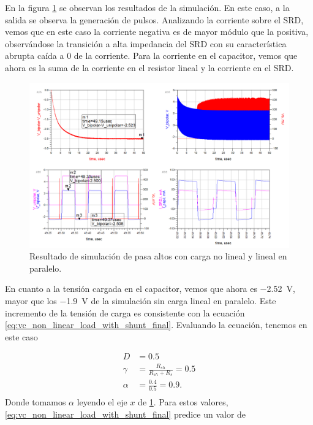 En la figura \ref{fig:highpass_non_linear_w_shunt_simulation_result} se observan
los resultados de la simulación. En este caso, a la salida se observa la
generación de pulsos. Analizando la corriente sobre el SRD, vemos que en este
caso la corriente negativa es de mayor módulo que la positiva, observándose la
transición a alta impedancia del SRD con su característica abrupta caída a $0$
de la corriente. Para la corriente en el capacitor, vemos que ahora es la suma
de la corriente en el resistor lineal y la corriente en el SRD.

\begin{figure}[tbp]
    \centering
    \includegraphics[width=\textwidth]{images/highpass_nonlinear_w_shunt_sim_result.png}
    \caption{Resultado de simulación de pasa altos con carga no lineal y lineal
    en paralelo.}
    \label{fig:highpass_non_linear_w_shunt_simulation_result}
\end{figure}

En cuanto a la tensión cargada en el capacitor, vemos que ahora es
\qty{-2.52}{\volt}, mayor que los \qty{-1.9}{\volt} de la simulación sin carga
lineal en paralelo. Este incremento de la tensión de carga es consistente con la
ecuación \ref{eq:vc_non_linear_load_with_shunt_final}. Evaluando la ecuación,
tenemos en este caso

\begin{equation}
    \begin{aligned}
        D &= 0.5 \\
        \gamma &= \frac{R_{sh}}{R_{sh}+R_{s}} =0.5 \\
        \alpha &= \frac{0.4}{0.5} = 0.9. \\
    \end{aligned}
\end{equation}
Donde tomamos $\alpha$ leyendo el eje $x$ de
\ref{fig:highpass_non_linear_w_shunt_simulation_result}. Para estos valores,
\ref{eq:vc_non_linear_load_with_shunt_final} predice un valor de

